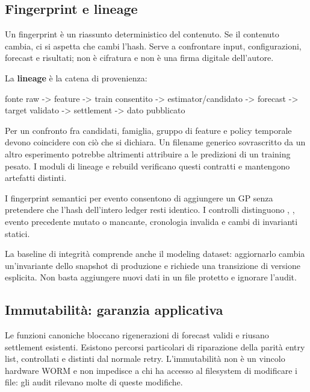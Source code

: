 \documentclass[11pt,a4paper]{article}
\newcommand{\code}[1]{{\ttfamily\small\seqsplit{#1}}}
\begin{document}
\subsection{Fingerprint e lineage}\label{fingerprint-e-lineage}

Un fingerprint è un riassunto deterministico del contenuto. Se il contenuto cambia, ci si aspetta che cambi l'hash. Serve a confrontare input, configurazioni, forecast e risultati; non è cifratura e non è una firma digitale dell'autore.

La \textbf{lineage} è la catena di provenienza:

\begin{CodeBlock}
fonte raw -> feature -> train consentito -> estimator/candidato
-> forecast -> target validato -> settlement -> dato pubblicato
\end{CodeBlock}

Per un confronto fra candidati, famiglia, gruppo di feature e policy temporale devono coincidere con ciò che si dichiara. Un filename generico sovrascritto da un altro esperimento potrebbe altrimenti attribuire a \code{uniform} le predizioni di un training pesato. I moduli di lineage e rebuild verificano questi contratti e mantengono artefatti distinti.

I fingerprint semantici per evento consentono di aggiungere un GP senza pretendere che l'hash dell'intero ledger resti identico. I controlli distinguono \code{UNCHANGED}, \code{VALID\_APPEND}, evento precedente mutato o mancante, cronologia invalida e cambi di invarianti statici.

La baseline di integrità comprende anche il modeling dataset: aggiornarlo cambia un'invariante dello snapshot di produzione e richiede una transizione di versione esplicita. Non basta aggiungere nuovi dati in un file protetto e ignorare l'audit.

\subsection{Immutabilità: garanzia applicativa}\label{immutabilituxe0-garanzia-applicativa}

Le funzioni canoniche bloccano rigenerazioni di forecast validi e riusano settlement esistenti. Esistono percorsi particolari di riparazione della parità entry list, controllati e distinti dal normale retry. L'immutabilità non è un vincolo hardware WORM e non impedisce a chi ha accesso al filesystem di modificare i file: gli audit rilevano molte di queste modifiche.
\end{document}
